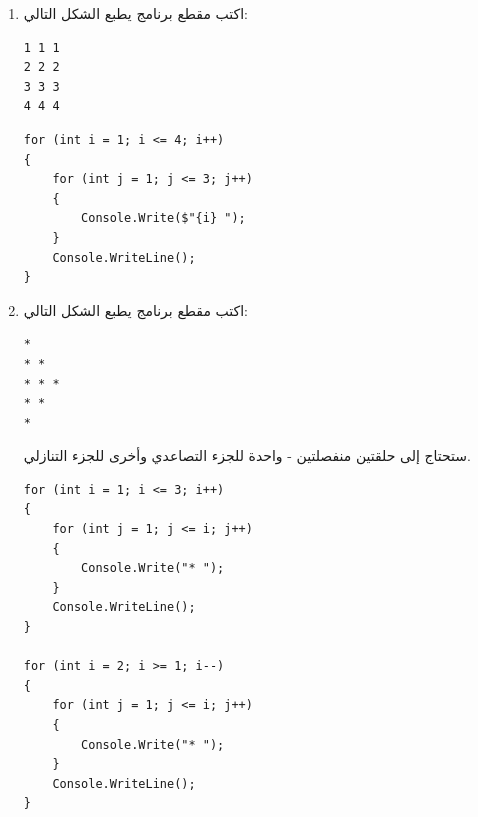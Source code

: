 \documentclass[14pt]{extarticle}
\begin{document}
\begin{enumerate}[itemsep=2em]
    \item
    اكتب مقطع برنامج يطبع الشكل التالي:
    \begin{english}
    \begin{boxCode}
\begin{verbatim}
1 1 1
2 2 2
3 3 3
4 4 4
    \end{verbatim}
\end{boxCode}
    \end{english}
    \ifwithsols
    \begin{boxSolution}
    \begin{english}
    \begin{verbatim}
for (int i = 1; i <= 4; i++)
{
    for (int j = 1; j <= 3; j++)
    {
        Console.Write($"{i} ");
    }
    Console.WriteLine();
}
    \end{verbatim}
    \end{english}
    \end{boxSolution}
    \fi

    \clearpage
    \item
    اكتب مقطع برنامج يطبع الشكل التالي:
    \begin{english}
    \begin{boxCode}
\begin{verbatim}
*
* *
* * *
* *
*
    \end{verbatim}
\end{boxCode}
    \end{english}
    \begin{boxHint}
        ستحتاج إلى حلقتين منفصلتين - واحدة للجزء التصاعدي وأخرى للجزء التنازلي.
    \end{boxHint}
    \ifwithsols
    \begin{boxSolution}
    \begin{english}
    \begin{verbatim}
for (int i = 1; i <= 3; i++)
{
    for (int j = 1; j <= i; j++)
    {
        Console.Write("* ");
    }
    Console.WriteLine();
}

for (int i = 2; i >= 1; i--)
{
    for (int j = 1; j <= i; j++)
    {
        Console.Write("* ");
    }
    Console.WriteLine();
}
    \end{verbatim}
    \end{english}
    \end{boxSolution}
    \fi

\end{enumerate}

\end{document}

